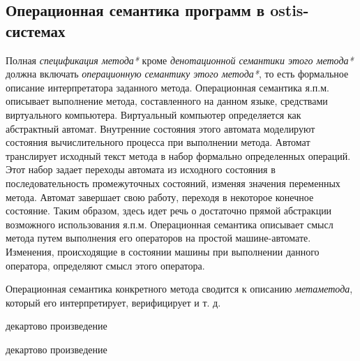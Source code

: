\subsection{Операционная семантика программ в ostis-системах}
\label{sec_programs_method_op_semantic}

Полная \textit{спецификация метода*} кроме \textit{денотационной семантики этого метода*} должна включать \textit{операционную семантику этого метода*}, то есть формальное описание интерпретатора заданного метода. Операционная семантика я.п.м. описывает выполнение метода, составленного на данном языке, средствами виртуального компьютера. Виртуальный компьютер определяется как абстрактный автомат. Внутренние состояния этого автомата моделируют состояния вычислительного процесса при выполнении метода. Автомат транслирует исходный текст метода в набор формально определенных операций. Этот набор задает переходы автомата из исходного состояния в последовательность промежуточных состояний, изменяя значения переменных метода. Автомат завершает свою работу, переходя в некоторое конечное состояние. Таким образом, здесь идет речь о достаточно прямой абстракции возможного использования я.п.м. Операционная семантика описывает смысл метода путем выполнения его операторов на простой машине-автомате. Изменения, происходящие в состоянии машины при выполнении данного оператора, определяют смысл этого оператора.

Операционная семантика конкретного метода сводится к описанию \textit{метаметода}, который его интерпретирует, верифицирует и т. д.

\begin{SCn}
\end{SCn}

\begin{SCn}
\begin{scnindent}
    \begin{scnreltovector}{декартово произведение}
    \end{scnreltovector}
\end{scnindent}
\begin{scnindent}
    \begin{scnreltovector}{декартово произведение}
    \end{scnreltovector}
\end{scnindent}
\end{SCn}

